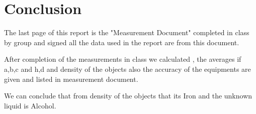 \documentclass[a4paper, 12pt]{article}
\begin{document}
\section{Conclusion}
 
The last page of this report is the "Measurement Document" completed in class by group and signed all the data used in the report are from this document.

After completion of  the measurements in class we calculated , the averages if a,b,c and h,d and  density of the objects also the accuracy of the equipments are given and listed in measurement document.

We can conclude that from density of the objects that its Iron and the unknown liquid is Alcohol.





\end{document}
